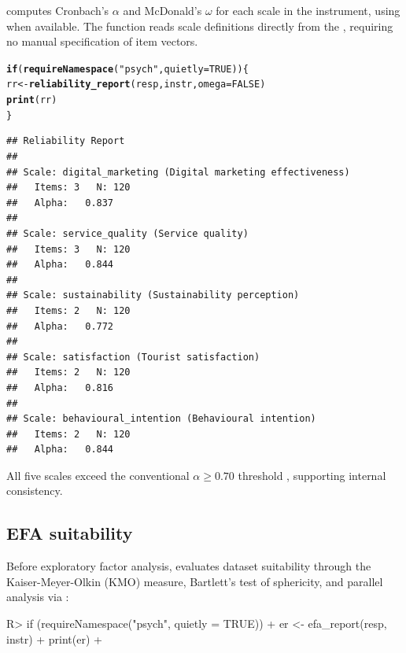 \documentclass[article]{jss}\usepackage[]{graphicx}\usepackage[]{xcolor}
\makeatletter
\newcommand{\hlnum}[1]{\textcolor[rgb]{0.686,0.059,0.569}{#1}}%
\newcommand{\hlsng}[1]{\textcolor[rgb]{0.192,0.494,0.8}{#1}}%
\newcommand{\hldef}[1]{\textcolor[rgb]{0.345,0.345,0.345}{#1}}%
\newcommand{\hlkwa}[1]{\textcolor[rgb]{0.161,0.373,0.58}{\textbf{#1}}}%
\newcommand{\hlkwb}[1]{\textcolor[rgb]{0.69,0.353,0.396}{#1}}%
\newcommand{\hlkwc}[1]{\textcolor[rgb]{0.333,0.667,0.333}{#1}}%
\newcommand{\hlkwd}[1]{\textcolor[rgb]{0.737,0.353,0.396}{\textbf{#1}}}%
\newenvironment{kframe}{%
 \def\at@end@of@kframe{}%
 \ifinner\ifhmode%
  \def\at@end@of@kframe{\end{minipage}}%
  \begin{minipage}{\columnwidth}%
 \fi\fi%
 \def\FrameCommand##1{\hskip\@totalleftmargin \hskip-\fboxsep
 \colorbox{shadecolor}{##1}\hskip-\fboxsep
     \hskip-\linewidth \hskip-\@totalleftmargin \hskip\columnwidth}%
 \MakeFramed {\advance\hsize-\width
   \@totalleftmargin\z@ \linewidth\hsize
   \@setminipage}}%
 {\par\unskip\endMakeFramed%
 \at@end@of@kframe}
\newenvironment{knitrout}{}{} %
\makeatother
\begin{document}
 computes Cronbach's $\alpha$
\citep{cronbach1951} and McDonald's $\omega$ \citep{mcdonald1999} for
each scale in the instrument, using  \citep{revelle2024}
when available. The function reads scale definitions directly from the
, requiring no manual specification of item vectors.

\begin{knitrout}
\color{fgcolor}\begin{kframe}
\begin{alltt}
\hlkwa{if} \hldef{(}\hlkwd{requireNamespace}\hldef{(}\hlsng{"psych"}\hldef{,} \hlkwc{quietly} \hldef{=} \hlnum{TRUE}\hldef{)) \{}
  \hldef{rr} \hlkwb{<-} \hlkwd{reliability_report}\hldef{(resp, instr,} \hlkwc{omega} \hldef{=} \hlnum{FALSE}\hldef{)}
  \hlkwd{print}\hldef{(rr)}
\hldef{\}}
\end{alltt}
\begin{verbatim}
## Reliability Report
## 
## Scale: digital_marketing (Digital marketing effectiveness)
##   Items: 3   N: 120
##   Alpha:   0.837
## 
## Scale: service_quality (Service quality)
##   Items: 3   N: 120
##   Alpha:   0.844
## 
## Scale: sustainability (Sustainability perception)
##   Items: 2   N: 120
##   Alpha:   0.772
## 
## Scale: satisfaction (Tourist satisfaction)
##   Items: 2   N: 120
##   Alpha:   0.816
## 
## Scale: behavioural_intention (Behavioural intention)
##   Items: 2   N: 120
##   Alpha:   0.844
\end{verbatim}
\end{kframe}
\end{knitrout}

All five scales exceed the conventional $\alpha \geq 0.70$ threshold
\citep{nunnally1978}, supporting internal consistency.

\subsection{EFA suitability}

Before exploratory factor analysis,  evaluates
dataset suitability through the Kaiser-Meyer-Olkin (KMO) measure,
Bartlett's test of sphericity, and parallel analysis via
:

\begin{Code}
R> if (requireNamespace("psych", quietly = TRUE)) {
+    er <- efa_report(resp, instr)
+    print(er)
+  }
\end{Code}
\end{document}
